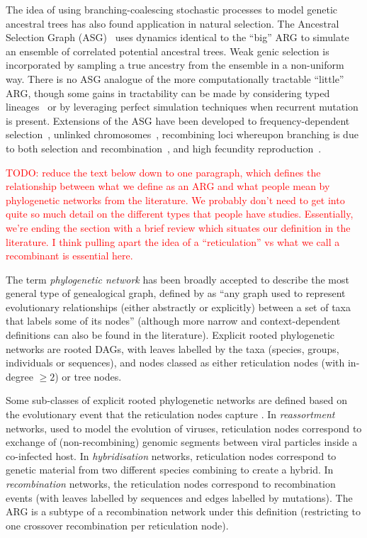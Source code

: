 \documentclass{article}
\begin{document}
The idea of using branching-coalescing stochastic processes
to model genetic ancestral trees has also found application in natural selection.
The Ancestral Selection Graph (ASG)~\citep{krone1997ancestral,neuhauser1997genealogy}
uses dynamics identical to the ``big'' ARG to simulate an ensemble of correlated
potential ancestral trees. Weak genic selection is incorporated by sampling a
true ancestry from the ensemble in a non-uniform way.
There is no ASG analogue of the more computationally tractable ``little'' ARG,
though some gains in tractability can be made by considering typed
lineages~\citep{etheridge2009coalescent} or by leveraging perfect simulation
techniques when recurrent mutation is present\citep{fearnhead2001perfect}.
Extensions of the ASG have been developed to frequency-dependent
selection~\citep{neuhauser1999ancestral, gonzalezcasanova2018duality},
unlinked chromosomes~\citep{fearnhead2003ancestral}, recombining
loci whereupon branching is due to both selection and
recombination~\citep{donnelly1999genealogical}, and high fecundity
reproduction~\citep{gonzalezcasanova2018duality, koskela2019robust}.

\textcolor{red}{TODO: reduce the text below down to one paragraph, which
defines the relationship between what we define as an ARG and
what people mean by phylogenetic networks from the literature.
We probably don't need to get into quite so much detail on
the different types that people have studies. Essentially,
we're ending the section with a brief review which situates
our definition in the literature. I think pulling apart the
idea of a ``reticulation'' vs what we call a recombinant
is essential here.}

The term \emph{phylogenetic network} has been broadly accepted to describe the most general
type of genealogical graph, defined by \citet{huson2010phylogenetic} as ``any graph used to
represent evolutionary relationships (either abstractly or explicitly) between a set of taxa
that labels some of its nodes'' (although more narrow and context-dependent definitions can also
be found in the literature). Explicit rooted phylogenetic networks are rooted DAGs,
with leaves labelled by the taxa (species, groups, individuals or sequences), and nodes classed
as either reticulation nodes (with in-degree $\geq 2$) or tree nodes.

Some sub-classes of explicit rooted phylogenetic networks are defined based on the evolutionary event that the
reticulation nodes capture \citep{huson2010phylogenetic}. In \emph{reassortment} networks, used to
model the evolution of viruses, reticulation nodes correspond to exchange of
(non-recombining) genomic segments between viral particles inside a co-infected host.
In \emph{hybridisation} networks, reticulation nodes correspond to genetic material from two
different species combining to create a hybrid. In \emph{recombination} networks, the reticulation nodes
correspond to recombination events (with leaves labelled by sequences and edges labelled by mutations).
The ARG is a subtype of a recombination network under this definition (restricting to one crossover
recombination per reticulation node).
\end{document}
